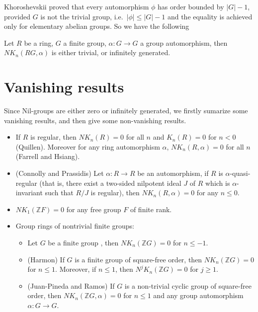 	Khoroshevskii\cite{Khoroshevskii1974On} proved that every automorphism $\phi$ has order bounded by $|G|-1$, provided $G$ is not the trivial group, i.e.\ $|\phi|\leq|G|-1$ and the equality is achieved only for elementary abelian groups. So we have the following
\begin{corollary}
		Let $R$ be a ring, $G$ a finite group, $\alpha \colon G \longrightarrow G$ a group automorphism, then $NK_n(RG,\alpha)$ is either trivial, or infinitely generated.
\end{corollary}



 
\section{Vanishing results} %
\label{sec:vanishing_results}
Since Nil-groups are either zero or infinitely generated, we firstly sumarize some vanishing results, and then give some non-vanishing results.
\begin{itemize}
	\item If $R$ is regular, then $NK_n(R)=0$ for all $n$ and $K_n(R)=0$ for $n<0$ (Quillen). Moreover for any ring automorphism $\alpha$, $NK_n(R,\alpha)=0$ for all $n$ (Farrell and Hsiang).
	\item (Connolly and Prassidis\cite{Connolly2002On}) Let $\alpha: R\longrightarrow R$ be an automorphism, if $R$ is $\alpha$-quasi-regular (that is, there exist a two-sided nilpotent ideal $J$ of $R$ which is $\alpha$-invariant such that $R/J$ is regular), then $NK_n(R,\alpha)=0$ for any $n\leq 0$.
	\item $NK_1(\mathbb{Z}F)=0$ for any free group $F$ of finite rank.
	\item Group rings of nontrivial finite groups:
		\begin{itemize}
			\item Let $G$ be a finite group , then $NK_n(\mathbb{Z}G)=0$ for $n\leq -1$.
			\item (Harmon\cite{MR88g:18012}) If $G$ is a finite group of square-free order, then $NK_n(\mathbb{Z}G)=0$ for $n\leq 1$. Moreover, if $n\leq 1$, then $N^jK_n(\mathbb{Z}G)=0$ for $j\geq 1$.
			\item (Juan-Pineda and Ramos\cite{Ramos2009On}) If $G$ is a non-trivial cyclic group of square-free order, then $NK_n(\mathbb{Z}G,\alpha)=0$ for $n\leq 1$ and any group automorphism $\alpha: G\longrightarrow G$.  
		\end{itemize}
\end{itemize}

